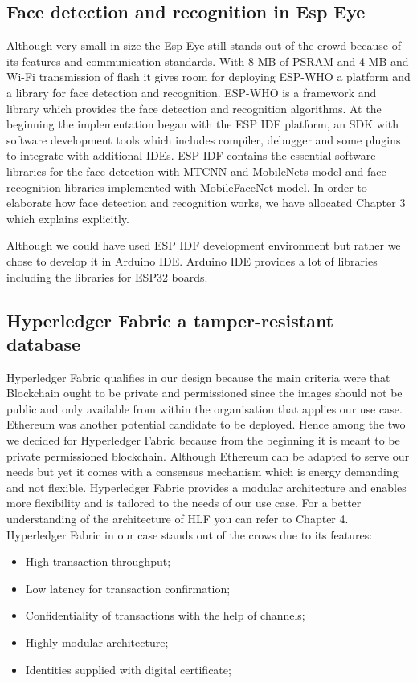 \subsection{Face detection and recognition in Esp Eye}
Although very small in size the Esp Eye still stands out of the crowd because of its features and communication standards. With 8 MB of PSRAM and 4 MB and Wi-Fi transmission of flash it gives room for deploying ESP-WHO a platform and a library for face detection and recognition. ESP-WHO is a framework and library which provides the face detection and recognition algorithms. At the beginning the implementation began with the ESP IDF platform, an SDK with software development tools which includes compiler, debugger and some plugins to integrate with additional IDEs.  ESP IDF contains the essential software libraries for the face detection with MTCNN and MobileNets model and face recognition libraries implemented with MobileFaceNet model. In order to elaborate how face detection and recognition works, we have allocated Chapter 3 which explains explicitly. 

Although we could have used ESP IDF development environment but rather we chose to develop it in Arduino IDE. Arduino IDE provides a lot of libraries including the libraries for ESP32 boards. 



\subsection{Hyperledger Fabric a tamper-resistant database}

  Hyperledger Fabric qualifies in our design because the main criteria were that Blockchain ought to be private and permissioned since the images should not be public and only available from within the organisation that applies our use case. Ethereum was another potential candidate to be deployed. Hence among the two we decided for Hyperledger Fabric because from the beginning it is meant to be private permissioned blockchain. Although Ethereum can be adapted to serve our needs but yet it comes with a consensus mechanism which is energy demanding and not flexible. Hyperledger Fabric provides a modular architecture and enables more flexibility and is tailored to the needs of our use case. For a better understanding of the architecture of HLF you can refer to Chapter 4.  Hyperledger Fabric in our case stands out of the crows due to its features: 

\begin{itemize}
    \item High transaction throughput;
    \item Low latency for transaction confirmation;
    \item Confidentiality of transactions with the help of channels;
    \item Highly modular architecture;
    \item Identities supplied with digital certificate;
\end{itemize}

